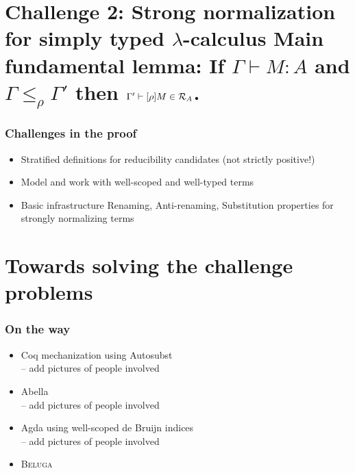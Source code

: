 \documentclass{beamer}
\newcommand{\beluga}{\textsc{Beluga}}
\begin{document}
\section{Challenge 2: Strong normalization  for simply typed
  $\lambda$-calculus \newline \newline
Main fundamental lemma: \newline If $\Gamma \vdash M : A$ and $\Gamma \leq_\rho
\Gamma'$ then $\Gamma' \vdash [\rho]M \in \mathcal{R}_A$. 
}


\begin{frame}
  \frametitle{Challenges in the proof}
\begin{itemize}
  \item Stratified definitions for reducibility candidates (not
    strictly positive!)
  \item Model and work with well-scoped and well-typed terms 
  \item Basic infrastructure
Renaming, Anti-renaming, Substitution properties for
      strongly normalizing terms 
\end{itemize}
\end{frame}



\section{Towards solving the challenge problems}

\begin{frame}
  \frametitle{On the way}
  
  \begin{itemize}
  \item Coq mechanization using Autosubst
\\ -- add pictures of people involved

  \item Abella\\
-- add pictures of people involved

  \item Agda using well-scoped de Bruijn indices
\\ -- add pictures of people involved

\item \beluga
  \end{itemize}
\end{frame}
\end{document}
